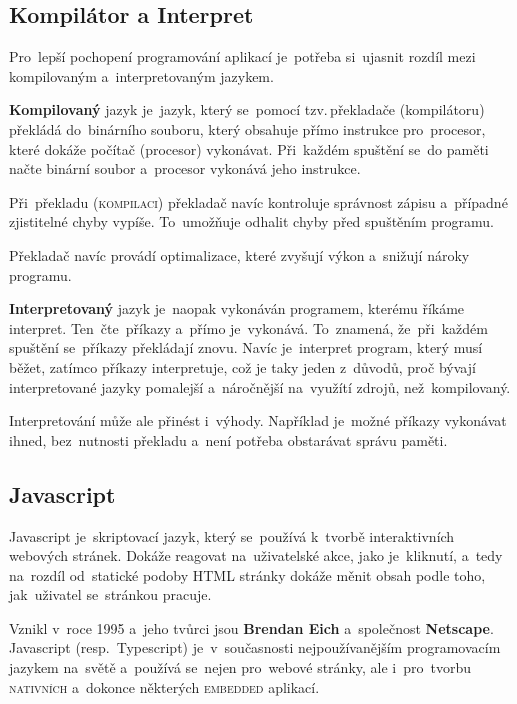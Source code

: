 \documentclass[14pt,a4paper]{article}
\begin{document}
        \subsection{Kompilátor a Interpret}
        Pro~lepší pochopení programování aplikací je~potřeba si~ujasnit rozdíl mezi kompilovaným a~interpretovaným jazykem.

        \textbf{Kompilovaný} jazyk je~jazyk, který se~pomocí tzv.\,překladače (kompilátoru) překládá do~binárního souboru, který obsahuje přímo instrukce pro~procesor, které dokáže počítač (procesor) vykonávat. Při~každém spuštění se~do paměti načte binární soubor a~procesor vykonává jeho instrukce.
        
        Při~překladu (\textsc{kompilaci}) překladač navíc kontroluje správnost zápisu a~případné zjistitelné chyby vypíše. To~umožňuje odhalit chyby před spuštěním programu.

        Překladač navíc provádí optimalizace, které zvyšují výkon a~snižují nároky programu.

        \textbf{Interpretovaný} jazyk je~naopak vykonáván programem, kterému říkáme interpret. Ten~čte~příkazy a~přímo je~vykonává. To~znamená, že~při~každém spuštění se~příkazy překládají znovu. Navíc je~interpret program, který musí běžet, zatímco příkazy interpretuje, což je taky jeden z~důvodů, proč bývají interpretované jazyky pomalejší a~náročnější na~využítí zdrojů, než~kompilovaný.
        
        Interpretování může ale přinést i~výhody. Například je~možné příkazy vykonávat ihned, bez~nutnosti překladu a~není potřeba obstarávat správu paměti. \parencite{ueda:compiled}
        
        \subsection{Javascript}
        Javascript je~skriptovací jazyk, který se~používá k~tvorbě interaktivních webových stránek. Dokáže reagovat na~uživatelské akce, jako je~kliknutí, a~tedy na~rozdíl od~statické podoby HTML stránky dokáže měnit obsah podle toho, jak~uživatel se~stránkou pracuje.

        Vznikl v~roce 1995 a~jeho tvůrci jsou \textbf{Brendan Eich} a~společnost \textbf{Netscape}. Javascript (resp.~Typescript) je~v~současnosti nejpoužívanějším programovacím jazykem na~světě a~používá se~nejen pro~webové stránky, ale i~pro~tvorbu \textsc{nativních} a~dokonce některých \textsc{embedded} aplikací.
\end{document}
